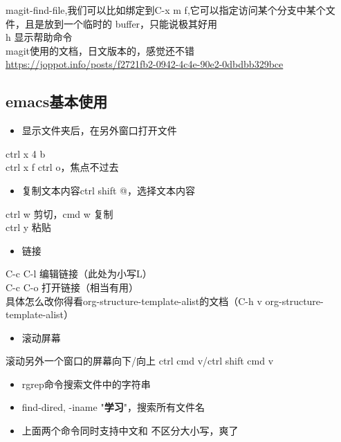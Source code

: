\documentclass[11pt]{article}
\begin{document}
magit-find-file,我们可以比如绑定到C-x m f,它可以指定访问某个分支中某个文件，且是放到一个临时的 buffer，只能说极其好用\\


h 显示帮助命令\\
magit使用的文档，日文版本的，感觉还不错\\
\url{https://joppot.info/posts/f2721fb2-0942-4c4e-90e2-0dbdbb329bce}\\

\subsection{emacs基本使用}
\label{sec:org020c938}
\begin{itemize}
\item 显示文件夹后，在另外窗口打开文件\\
\end{itemize}
ctrl x 4 b\\
ctrl x f ctrl o，焦点不过去\\

\begin{itemize}
\item 复制文本内容ctrl shift @，选择文本内容\\
\end{itemize}
ctrl w 剪切，cmd w 复制\\
ctrl y 粘贴\\

\begin{itemize}
\item 链接\\
\end{itemize}
C-c C-l	编辑链接（此处为小写L）\\
C-c C-o	打开链接（相当有用）\\

具体怎么改你得看org-structure-template-alist的文档（C-h v org-structure-template-alist）\\


\begin{itemize}
\item 滚动屏幕\\
\end{itemize}
滚动另外一个窗口的屏幕向下/向上 ctrl cmd v/ctrl shift cmd v\\

\begin{itemize}
\item rgrep命令搜索文件中的字符串\\
\item find-dired, -iname "\textbf{学习}"，搜索所有文件名\\
\item 上面两个命令同时支持中文和 不区分大小写，爽了\\
\end{itemize}
\end{document}
